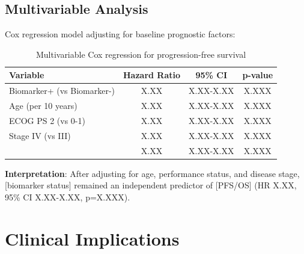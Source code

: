 \documentclass[10pt,letterpaper]{article}
\begin{document}
\subsection{Multivariable Analysis}

Cox regression model adjusting for baseline prognostic factors:

\begin{table}[H]
\centering
\small
\begin{tabular}{lccc}
\toprule
\textbf{Variable} & \textbf{Hazard Ratio} & \textbf{95\% CI} & \textbf{p-value} \\
\midrule
Biomarker+ (vs Biomarker-) & X.XX & X.XX-X.XX & X.XXX \\
Age (per 10 years) & X.XX & X.XX-X.XX & X.XXX \\
ECOG PS 2 (vs 0-1) & X.XX & X.XX-X.XX & X.XXX \\
Stage IV (vs III) & X.XX & X.XX-X.XX & X.XXX \\
[Additional variable] & X.XX & X.XX-X.XX & X.XXX \\
\bottomrule
\end{tabular}
\caption{Multivariable Cox regression for progression-free survival}
\end{table}

\textbf{Interpretation}: After adjusting for age, performance status, and disease stage, [biomarker status] remained an independent predictor of [PFS/OS] (HR X.XX, 95\% CI X.XX-X.XX, p=X.XXX).

\section{Clinical Implications}
\end{document}
